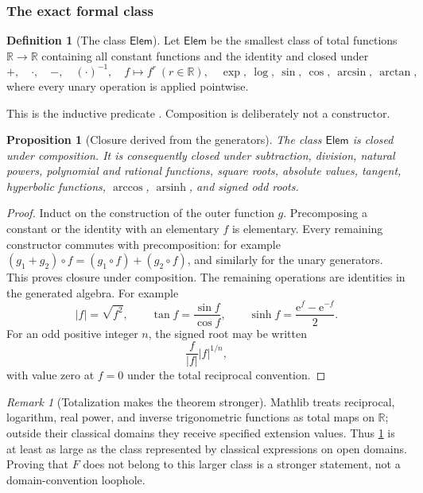 \documentclass[11pt,oneside]{article}
\newtheorem{proposition}[theorem]{Proposition}
\theoremstyle{definition}
\newtheorem{definition}[theorem]{Definition}
\theoremstyle{remark}
\newtheorem{remark}[theorem]{Remark}
\newcommand{\R}{\mathbb R}
\newcommand{\e}{\mathrm e}
\begin{document}
\subsubsection{The exact formal class}

\begin{definition}[The class $\mathsf{Elem}$]
\label{integration:def:elementary-class}
Let $\mathsf{Elem}$ be the smallest class of total functions $\R\to\R$ containing all
constant functions and the identity and closed under
\begin{equation}
 +,\quad\cdot,\quad-,\quad(\cdot)^{-1},\quad
 f\mapsto f^r\ (r\in\R),\quad
 \exp,\ \log,\ \sin,\ \cos,\ \arcsin,\ \arctan,
 \label{integration:eq:elementary-generators}
\end{equation}
where every unary operation is applied pointwise.
\end{definition}

This is the inductive predicate .  Composition is deliberately not a
constructor.

\begin{proposition}[Closure derived from the generators]
\label{integration:prop:elementary-derived}
The class $\mathsf{Elem}$ is closed under composition.  It is consequently closed under
subtraction, division, natural powers, polynomial and rational functions, square roots,
absolute values, tangent, hyperbolic functions, $\arccos$, $\operatorname{arsinh}$, and
signed odd roots.
\end{proposition}

\begin{proof}
Induct on the construction of the outer function $g$.  Precomposing a constant or the
identity with an elementary $f$ is elementary.  Every remaining constructor commutes with
precomposition: for example $(g_1+g_2)\circ f=(g_1\circ f)+(g_2\circ f)$, and similarly for
the unary generators.  This proves closure under composition.  The remaining operations
are identities in the generated algebra.  For example
\[
 |f|=\sqrt{f^2},
 \qquad
 \tan f=\frac{\sin f}{\cos f},
 \qquad
 \sinh f=\frac{\e^f-\e^{-f}}2.
\]
For an odd positive integer $n$, the signed root may be written
\[
 \frac{f}{|f|}|f|^{1/n},
\]
with value zero at $f=0$ under the total reciprocal convention.
\end{proof}

\begin{remark}[Totalization makes the theorem stronger]
\label{integration:rem:elementary-totalization}
Mathlib treats reciprocal, logarithm, real power, and inverse trigonometric functions as
total maps on $\R$; outside their classical domains they receive specified extension values.
Thus \cref{integration:def:elementary-class} is at least as large as the class represented by classical
expressions on open domains.  Proving that $F$ does not belong to this larger class is a
stronger statement, not a domain-convention loophole.
\end{remark}
\end{document}
